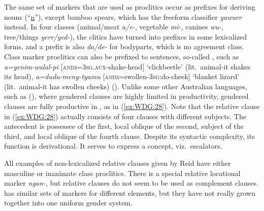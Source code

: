 \documentclass[output=collectionpaper]{langsci/langscibook}
\begin{document}
The same set of markers that are used as proclitics occur as prefixes for deriving nouns (``\uline{n}''), except bamboo spears, which has the freeform classifier \textit{yawurr} instead. In four classes (animal/meat \textit{a/e-}, vegetable \textit{mi-}, canines \textit{wu-}, tree/things \textit{yerr/yed-}), the clitics have turned into prefixes in some lexicalized forms, and a prefix is also \textit{da/de-} for bodyparts, which is no agreement class. Class marker proclitics can also be prefixed to sentences, so-called , such as \textit{a=yenim-walal-pi} [\textsc{anim=3sg.aux}-shake-head] `clickbeetle' (lit.\ animal-it shakes its head), \textit{a=dudu-meny-tyamu} [\textsc{anim}=swollen-3\textsc{sg}:do-cheek] `blanket lizard' (lit.\ animal-it has swollen cheeks) (\citealt[210]{Reid1997}). Unlike some other Australian languages, such as  (), where gendered clauses are highly limited in productivity, gendered clauses are fully productive in , as in (\ref{ex:WDG:28}). Note that the relative clause in (\ref{ex:WDG:28}) actually consists of four clauses with different subjects. The antecedent is possessee of the first, local oblique of the second, subject of the third, and local oblique of the fourth clause. Despite its syntactic complexity, its function is derivational. It serves to express a concept, viz.\ escalators.

%

All examples of non-lexicalized relative clauses given by Reid have either masculine or inanimate class proclitics. There is a special relative locational marker \textit{ngan-}, but relative clauses do not seem to be used as complement clauses.  has similar sets of markers for different elements, but they have not really grown together into one uniform gender system.
\end{document}
